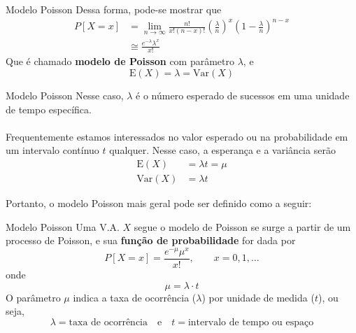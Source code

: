 \documentclass[10pt]{beamer}\usepackage[]{graphicx}\usepackage[]{color}
\providecommand{\E}{\text{E}}
\providecommand{\Var}{\text{Var}}
\theoremstyle{definition}
\begin{document}
\begin{frame}[fragile]{Modelo Poisson}
  Dessa forma, pode-se mostrar que
  \begin{align*}
    P[X = x] &= \lim_{n \to \infty} \frac{n!}{x!(n-x)!}
               \left( \frac{\lambda}{n} \right)^x
               \left( 1 - \frac{\lambda}{n}  \right)^{n-x} \\
             &\cong \frac{e^{-\lambda} \lambda^x}{x!}
  \end{align*}
  Que é chamado \textbf{modelo de Poisson} com parâmetro $\lambda$, e
  \begin{equation*}
  \E(X) = \lambda = \Var(X)
\end{equation*}
\end{frame}

\begin{frame}[fragile]{Modelo Poisson}
  Nesse caso, $\lambda$ é o número esperado de sucessos em uma unidade
  de tempo específica. \\~\\
  Frequentemente estamos interessados no valor esperado ou na
  probabilidade em um intervalo contínuo $t$ qualquer. Nesse caso, a
  esperança e a variância serão
  \begin{align*}
    \E(X) &= \lambda t = \mu \\
    \Var(X) &= \lambda t
  \end{align*}
  \vspace{1em}

  Portanto, o modelo Poisson mais geral pode ser definido como a seguir:
\end{frame}

\begin{frame}[fragile]{Modelo Poisson}
  Uma V.A. $X$ segue o modelo de Poisson se surge a partir de um
  processo de Poisson, e sua \textbf{função de probabilidade} for dada
  por
  \begin{equation*}
    P[X = x] = \frac{e^{-\mu} \mu^x}{x!}, \quad \quad x = 0, 1, \ldots
  \end{equation*}
  onde
  \begin{equation*}
    \mu = \lambda \cdot t
  \end{equation*}
  O parâmetro $\mu$ indica a taxa de ocorrência ($\lambda$) por unidade
  de medida ($t$), ou seja, %
  \begin{equation*}
    \lambda = \text{taxa de ocorrência} \quad \text{e} \quad t =
    \text{intervalo de tempo ou espaço}
  \end{equation*}
\end{frame}
\end{document}
